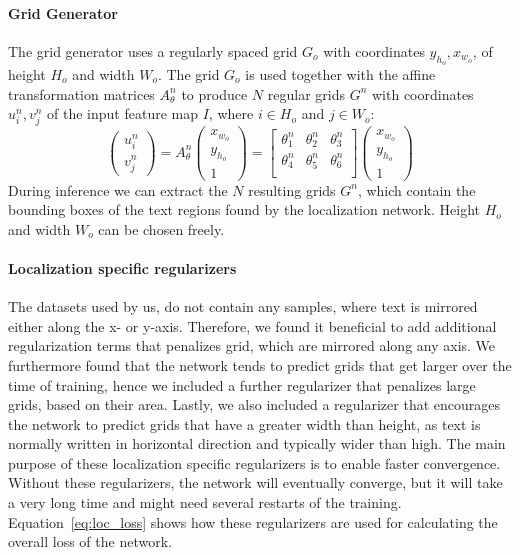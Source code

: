 \documentclass[letterpaper]{article}
\begin{document}
	\paragraph{Grid Generator}
		The grid generator uses a regularly spaced grid $G_o$ with coordinates $y_{h_o},x_{w_o}$, of height $H_o$ and width $W_o$. The grid $G_o$ is used together with the affine transformation matrices $A^{n}_{\theta}$ to produce $N$ regular grids $G^n$ with coordinates $u^n_{i},v^n_{j}$ of the input feature map $I$, where $i \in H_o$ and $j \in W_o$:
		\begin{equation}
			\begin{pmatrix}
				u^n_{i} \\
				v^n_{j}
			\end{pmatrix}
			= A^{n}_{\theta}
			\begin{pmatrix}
				x_{w_o} \\
				y_{h_o} \\
				1
			\end{pmatrix}
			= \begin{bmatrix}
				\theta^{n}_1 & \theta^{n}_2 & \theta^{n}_3 \\
				\theta^{n}_4 & \theta^{n}_5 & \theta^{n}_6 \\
			\end{bmatrix}
			\begin{pmatrix}
				x_{w_o} \\
				y_{h_o} \\
				1
			\end{pmatrix}
		\end{equation}
		During inference we can extract the $N$ resulting grids $G^n$, which contain the bounding boxes of the text regions found by the localization network.
		Height $H_o$ and width $W_o$ can be chosen freely.

	\paragraph{Localization specific regularizers}
		The datasets used by us, do not contain any samples, where text is mirrored either along the x- or y-axis.
		Therefore, we found it beneficial to add additional regularization terms that penalizes grid, which are mirrored along any axis.
		We furthermore found that the network tends to predict grids that get larger over the time of training, hence we included a further regularizer that penalizes large grids, based on their area.
		Lastly, we also included a regularizer that encourages the network to predict grids that have a greater width than height, as text is normally written in horizontal direction and typically wider than high.
		The main purpose of these localization specific regularizers is to enable faster convergence.
		Without these regularizers, the network will eventually converge, but it will take a very long time and might need several restarts of the training.
		Equation~\ref{eq:loc_loss} shows how these regularizers are used for calculating the overall loss of the network.
\end{document}
